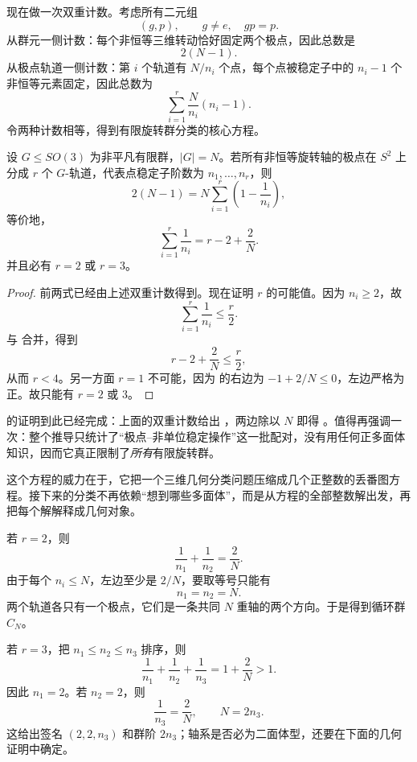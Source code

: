 现在做一次双重计数。考虑所有二元组
\[
(g,p),\qquad g\neq e,\quad gp=p.
\]
从群元一侧计数：每个非恒等三维转动恰好固定两个极点，因此总数是
\[
2(N-1).
\]
从极点轨道一侧计数：第 $i$ 个轨道有 $N/n_i$ 个点，每个点被稳定子中的 $n_i-1$ 个非恒等元素固定，因此总数为
\[
\sum_{i=1}^r \frac{N}{n_i}(n_i-1).
\]
令两种计数相等，得到有限旋转群分类的核心方程。

\begin{theorem}[有限旋转群的基本方程]
设 $G\leqslant SO(3)$ 为非平凡有限群，$|G|=N$。若所有非恒等旋转轴的极点在 $S^2$ 上分成 $r$ 个 $G$-轨道，代表点稳定子阶数为 $n_1,\dots,n_r$，则
\[
2(N-1)=N\sum_{i=1}^r\left(1-\frac1{n_i}\right),
\label{eq:finite-rotation-counting}
\]
等价地，
\[
\sum_{i=1}^r\frac1{n_i}=r-2+\frac2N.
\label{eq:finite-rotation-master}
\]
并且必有 $r=2$ 或 $r=3$。
\label{thm:finite-rotation-master}

\end{theorem}

\begin{proof}
前两式已经由上述双重计数得到。现在证明 $r$ 的可能值。因为 $n_i\ge2$，故
\[
\sum_{i=1}^r\frac1{n_i}\le \frac r2.
\]
与  合并，得到
\[
r-2+\frac2N\le\frac r2,
\]
从而 $r<4$。另一方面 $r=1$ 不可能，因为  的右边为 $-1+2/N\le0$，左边严格为正。故只能有 $r=2$ 或 $3$。
\end{proof}

 的证明到此已经完成：上面的双重计数给出 ，两边除以 $N$ 即得 。值得再强调一次：整个推导只统计了“极点--非单位稳定操作”这一批配对，没有用任何正多面体知识，因而它真正限制了\emph{所有}有限旋转群。

这个方程的威力在于，它把一个三维几何分类问题压缩成几个正整数的丢番图方程。接下来的分类不再依赖“想到哪些多面体”，而是从方程的全部整数解出发，再把每个解解释成几何对象。

若 $r=2$，则
\[
\frac1{n_1}+\frac1{n_2}=\frac2N.
\]
由于每个 $n_i\le N$，左边至少是 $2/N$，要取等号只能有
\[
n_1=n_2=N.
\]
两个轨道各只有一个极点，它们是一条共同 $N$ 重轴的两个方向。于是得到循环群 $C_N$。

若 $r=3$，把 $n_1\le n_2\le n_3$ 排序，则
\[
\frac1{n_1}+\frac1{n_2}+\frac1{n_3}=1+\frac2N>1.
\]
因此 $n_1=2$。若 $n_2=2$，则
\[
\frac1{n_3}=\frac2N,
\qquad N=2n_3.
\]
这给出签名 $(2,2,n_3)$ 和群阶 $2n_3$；轴系是否必为二面体型，还要在下面的几何证明中确定。

